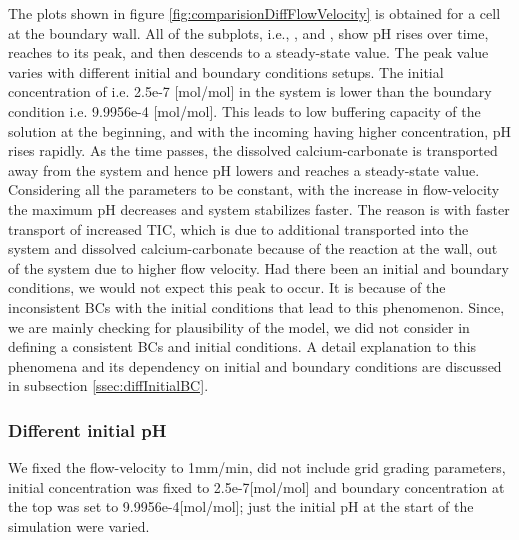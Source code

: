 The plots shown in figure \ref{fig:comparisionDiffFlowVelocity} is obtained for a cell at the boundary wall. All of the subplots, i.e., ,  and , show pH rises over time, reaches to its peak, and then descends to a steady-state value. The peak value varies with different initial and boundary conditions setups. 
The initial concentration of  i.e. 2.5e-7 [mol/mol] in the system is lower than the boundary condition i.e. 9.9956e-4 [mol/mol]. This leads to low buffering capacity of the solution at the beginning, and with the incoming  having higher concentration, pH rises rapidly. As the time passes, the dissolved calcium-carbonate is transported away from the system and hence pH lowers and reaches a steady-state value.\\
Considering all the parameters to be constant, with the increase in flow-velocity the maximum pH decreases and system stabilizes faster. The reason is with faster transport of increased TIC, which is due to additional  transported into the system and dissolved calcium-carbonate because of the reaction at the wall, out of the system due to higher flow velocity. Had there been an initial and boundary conditions, we would not expect this peak to occur. It is because of the inconsistent BCs with the initial conditions that lead to this phenomenon. Since, we are mainly checking for plausibility of the model, we did not consider in defining a consistent BCs and initial conditions. A detail explanation to this phenomena and its dependency on initial and boundary conditions are discussed in subsection \ref{ssec:diffInitialBC}.


\subsubsection*{Different initial pH} \label{ssec:diffpH}
We fixed the flow-velocity to 1mm/min, did not include grid grading parameters, initial  concentration was fixed to 2.5e-7[mol/mol] and boundary concentration at the top was set to 9.9956e-4[mol/mol]; just the initial pH at the start of the simulation were varied.

